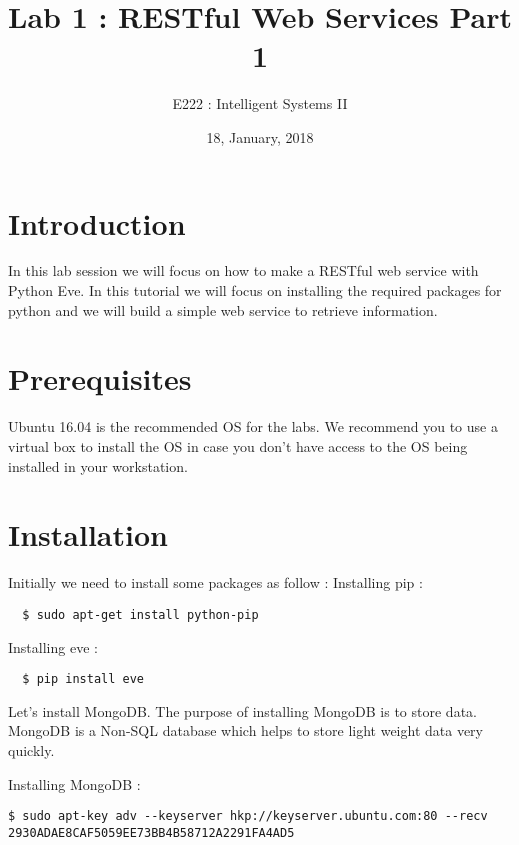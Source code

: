 \documentclass{article}
\title{Lab 1 : RESTful Web Services Part 1}
\author{E222 : Intelligent Systems II }
\date{18, January, 2018}
\begin{document}
\maketitle


\section{Introduction}

In this lab session we will focus on how to make a RESTful web service
with Python Eve. In this tutorial we will focus on installing the
required packages for python and we will build a simple web service to
retrieve information.

\section{Prerequisites}

Ubuntu 16.04 is the recommended OS for the labs. We recommend you to
use a virtual box to install the OS in case you don't have access to
the OS being installed in your workstation.

\section{Installation}

Initially we need to install some packages as follow :
\newline
\noindent  Installing pip :
\begin{verbatim}
  $ sudo apt-get install python-pip
\end{verbatim}


\noindent  Installing eve :
\begin{verbatim}
  $ pip install eve
\end{verbatim}

Let's install MongoDB. The purpose of installing MongoDB is to store
data. MongoDB is a Non-SQL database which helps to store light weight
data very quickly.


\noindent  Installing MongoDB :

\begin{verbatim}
$ sudo apt-key adv --keyserver hkp://keyserver.ubuntu.com:80 --recv 
2930ADAE8CAF5059EE73BB4B58712A2291FA4AD5
\end{verbatim}
\end{document}
